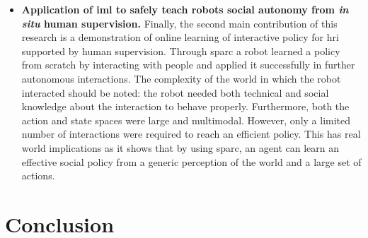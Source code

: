 \begin{itemize}
	\item \textbf{Application of \gls{iml} to safely teach robots social autonomy from \textit{in situ} human supervision.} Finally, the second main contribution of this research is a demonstration of online learning of interactive policy for \gls{hri} supported by human supervision. Through \gls{sparc} a robot learned a policy from scratch by interacting with people and applied it successfully in further autonomous interactions. The complexity of the world in which the robot interacted should be noted: the robot needed both technical and social knowledge about the interaction to behave properly. Furthermore, both the action and state spaces were large and multimodal. However, only a limited number of interactions were required to reach an efficient policy.	This has real world implications as it shows that by using \gls{sparc}, an agent can learn an effective social policy from a generic perception of the world and a large set of actions. 
	
\end{itemize}

\section{Conclusion}\label{sec:conc_conc}

